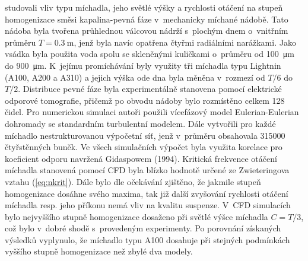 \citet{hos10} studovali vliv typu míchadla, jeho světlé výšky a rychlosti otáčení na stupeň homogenizace směsi kapalina-pevná fáze v~mechanicky míchané nádobě. Tato nádoba byla tvořena průhlednou válcovou nádrží s~plochým dnem o~vnitř\-ním průměru $T=\SI{0.3}{\meter}$, jenž byla navíc opatřena čtyřmi radiálními narážkami. Jako vsádka byla použita voda spolu se skleněnými kuličkami o~průměru od \SI{100}{\micro\meter} do \SI{900}{\micro\meter}. K~jejímu promíchávání byly využity tři míchadla typu Lightnin (A100, A200 a A310) a jejich výška ode dna byla měněna v~rozmezí od $T/6$ do $T/2$. Distribuce pevné fáze byla experimentálně stanovena pomocí elektrické odporové tomografie, přičemž po obvodu nádoby bylo rozmístěno celkem \num{128} čidel. Pro numerickou simulaci autoři použili vícefázový model Eulerian-Eulerian dohromady se standardním \keps{} turbulentní modelem. Dále vytvořili pro každé míchadlo nestrukturovanou výpočetní síť, jenž v~průměru obsahovala \num{315000} čtyřstěnných buněk. Ve všech simulačních výpočet byla využita korelace pro koeficient odporu navržená Gidaspowem (1994). Kritická frekvence otáčení míchadla stanovená pomocí CFD byla blízko hodnotě určené ze Zwieteringova vztahu (\ref{eq:nkrit}). Dále bylo dle očekávání  zjištěno, že jakmile stupeň homogenizace dosáhne svého maxima, tak již další zvyšování rychlosti otáčení míchadla resp. jeho příkonu nemá vliv na kvalitu suspenze. V~CFD simulacích bylo nejvyššího stupně homogenizace dosaženo při světlé výšce míchadla $C=T/3$, což bylo v~dobré shodě s~provedeným experimenty. Po porovnání získaných výsledků vyplynulo, že míchadlo typu A100 dosahuje při stejných podmínkách vyššího stupně homogenizace než zbylé dva modely.

